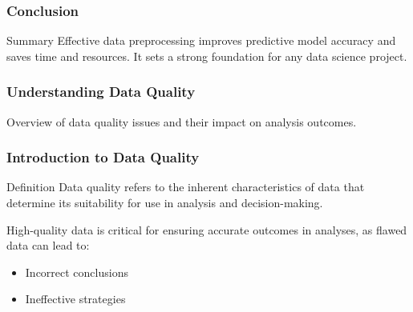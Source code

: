 \documentclass{beamer}
\begin{document}
\begin{frame}[fragile]
    \frametitle{Conclusion}
    \begin{block}{Summary}
        Effective data preprocessing improves predictive model accuracy and saves time and resources. It sets a strong foundation for any data science project.
    \end{block}
\end{frame}

\begin{frame}[fragile]
    \frametitle{Understanding Data Quality}
    Overview of data quality issues and their impact on analysis outcomes.
\end{frame}

\begin{frame}[fragile]
    \frametitle{Introduction to Data Quality}
    \begin{block}{Definition}
        Data quality refers to the inherent characteristics of data that determine its suitability for use in analysis and decision-making.
    \end{block}
    High-quality data is critical for ensuring accurate outcomes in analyses, as flawed data can lead to:
    \begin{itemize}
        \item Incorrect conclusions
        \item Ineffective strategies
    \end{itemize}
\end{frame}
\end{document}
